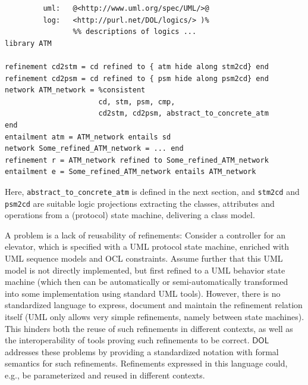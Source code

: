\documentclass[10pt, a4paper]{isov2}
\newcommand*{\DOL}{\ensuremath{\mathsf{DOL}}\xspace}
\begin{document}
\begin{lstlisting}[basicstyle=\ttfamily,language=dolText,escapechar=@,mathescape]
%prefix( :      <http://www.example.org/uml/>
         uml:   @<http://www.uml.org/spec/UML/>@
         log:   <http://purl.net/DOL/logics/> )%
                %% descriptions of logics ...
library ATM

refinement cd2stm = cd refined to { atm hide along stm2cd} end
refinement cd2psm = cd refined to { psm hide along psm2cd} end
network ATM_network = %consistent
                      cd, stm, psm, cmp,
                      cd2stm, cd2psm, abstract_to_concrete_atm
end
entailment atm = ATM_network entails sd
network Some_refined_ATM_network = ... end
refinement r = ATM_network refined to Some_refined_ATM_network
entailment e = Some_refined_ATM_network entails ATM_network
\end{lstlisting}
Here, \texttt{abstract\_to\_concrete\_atm} is defined in the next
section, and \texttt{stm2cd} and \texttt{psm2cd} are suitable logic
projections extracting the classes, attributes and operations from a
(protocol) state machine, delivering a class model.



\label{model-2}

A problem is a lack of reusability of refinements: Consider a controller for an elevator, which is specified with a UML protocol state machine, enriched with UML 
sequence models and OCL constraints. Assume further that this UML model is not directly implemented, but first refined to a UML behavior state machine (which then 
can be automatically or semi-automatically transformed into some implementation using standard UML tools). However, there is no standardized language to 
express, document and maintain the refinement relation itself (UML only allows very simple refinements, namely between state machines). This hinders both the 
reuse of such refinements in different contexts, as well as the interoperability of tools proving such refinements to be correct. \DOL  
addresses these problems by providing a standardized notation with formal semantics for such refinements. Refinements expressed in this language could, e.g., be 
parameterized and reused in different contexts.
\end{document}
